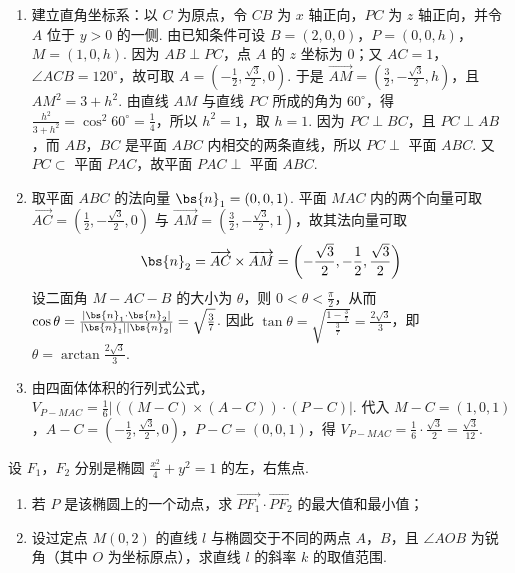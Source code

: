 \begin{solution}
\begin{enumerate}
\item 建立直角坐标系：以 \(C\) 为原点，令 \(CB\) 为 \(x\) 轴正向，\(PC\) 为 \(z\) 轴正向，并令 \(A\) 位于 \(y>0\) 的一侧. 由已知条件可设 \(B=(2,0,0)\)，\(P=(0,0,h)\)，\(M=(1,0,h)\). 因为 \(AB\perp PC\)，点 \(A\) 的 \(z\) 坐标为 \(0\)；又 \(AC=1\)，\(\angle ACB=120^{\circ}\)，故可取 \(A=\left(-\frac{1}{2},\frac{\sqrt{3}}{2},0\right)\). 于是 \(\overrightarrow{AM}=\left(\frac{3}{2},-\frac{\sqrt{3}}{2},h\right)\)，且 \(AM^2=3+h^2\). 由直线 \(AM\) 与直线 \(PC\) 所成的角为 \(60^{\circ}\)，得 \(\frac{h^2}{3+h^2}=\cos^2 60^{\circ}=\frac{1}{4}\)，所以 \(h^2=1\)，取 \(h=1\). 因为 \(PC\perp BC\)，且 \(PC\perp AB\)，而 \(AB\)，\(BC\) 是平面 \(ABC\) 内相交的两条直线，所以 \(PC\perp\) 平面 \(ABC\). 又 \(PC\subset\) 平面 \(PAC\)，故平面 \(PAC\perp\) 平面 \(ABC\).
\item 取平面 \(ABC\) 的法向量 \(\bs{n}_1=(0,0,1)\). 平面 \(MAC\) 内的两个向量可取 \(\overrightarrow{AC}=\left(\frac{1}{2},-\frac{\sqrt{3}}{2},0\right)\) 与 \(\overrightarrow{AM}=\left(\frac{3}{2},-\frac{\sqrt{3}}{2},1\right)\)，故其法向量可取
\[
\bs{n}_2=\overrightarrow{AC}\times\overrightarrow{AM}=\left(-\frac{\sqrt{3}}{2},-\frac{1}{2},\frac{\sqrt{3}}{2}\right)
\]
设二面角 \(M-AC-B\) 的大小为 \(\theta\)，则 \(0<\theta<\frac{\pi}{2}\)，从而 \(\cos\theta=\frac{|\bs{n}_1\cdot\bs{n}_2|}{|\bs{n}_1||\bs{n}_2|}=\sqrt{\frac{3}{7}}\). 因此 \(\tan\theta=\sqrt{\frac{1-\frac{3}{7}}{\frac{3}{7}}}=\frac{2\sqrt{3}}{3}\)，即 \(\theta=\arctan\frac{2\sqrt{3}}{3}\).
\item 由四面体体积的行列式公式，\(V_{P-MAC}=\frac{1}{6}\left|((M-C)\times(A-C))\cdot(P-C)\right|\). 代入 \(M-C=(1,0,1)\)，\(A-C=\left(-\frac{1}{2},\frac{\sqrt{3}}{2},0\right)\)，\(P-C=(0,0,1)\)，得 \(V_{P-MAC}=\frac{1}{6}\cdot\frac{\sqrt{3}}{2}=\frac{\sqrt{3}}{12}\).
\end{enumerate}
\end{solution}


\begin{problem}
设 \(F_{1}\)，\(F_{2}\) 分别是椭圆 \(\frac{x^{2}}{4} + y^{2} = 1\) 的左，右焦点.

\begin{enumerate}
\item 若 \(P\) 是该椭圆上的一个动点，求 \(\overrightarrow{PF_{1}} \cdot \overrightarrow{PF_{2}}\) 的最大值和最小值；
\item 设过定点 \(M(0,2)\) 的直线 \(l\) 与椭圆交于不同的两点 \(A\)，\(B\)，且 \(\angle AOB\) 为锐角（其中 \(O\) 为坐标原点），求直线 \(l\) 的斜率 \(k\) 的取值范围.
\end{enumerate}
\end{problem}

